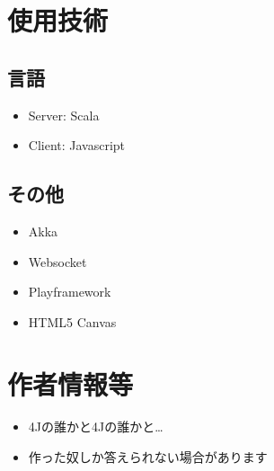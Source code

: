 \documentclass{jsarticle}
\begin{document}
\section{使用技術}\label{ux4f7fux7528ux6280ux8853}

\subsection{言語}\label{ux8a00ux8a9e}

\begin{itemize}
\item
  Server: Scala
\item
  Client: Javascript
\end{itemize}

\subsection{その他}\label{ux305dux306eux4ed6}

\begin{itemize}
\item
  Akka
\item
  Websocket
\item
  Playframework
\item
  HTML5 Canvas
\end{itemize}

\section{作者情報等}\label{ux4f5cux8005ux60c5ux5831ux7b49}

\begin{itemize}
\item
  4Jの誰かと4Jの誰かと\ldots{}
\item
  作った奴しか答えられない場合があります
\end{itemize}
\end{document}
